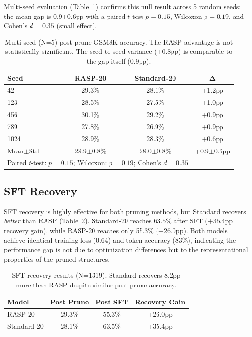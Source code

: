 \documentclass[11pt,a4paper]{article}
\begin{document}
Multi-seed evaluation (Table~\ref{tab:multiseed}) confirms this null result across 5 random seeds: the mean gap is 0.9$\pm$0.6pp with a paired $t$-test $p{=}0.15$, Wilcoxon $p{=}0.19$, and Cohen's $d{=}0.35$ (small effect).

\begin{table}[t]
\centering
\small
\begin{tabular}{lccc}
\toprule
\textbf{Seed} & \textbf{RASP-20} & \textbf{Standard-20} & $\boldsymbol{\Delta}$ \\
\midrule
42 & 29.3\% & 28.1\% & +1.2pp \\
123 & 28.5\% & 27.5\% & +1.0pp \\
456 & 30.1\% & 29.2\% & +0.9pp \\
789 & 27.8\% & 26.9\% & +0.9pp \\
1024 & 28.9\% & 28.3\% & +0.6pp \\
\midrule
Mean$\pm$Std & 28.9$\pm$0.8\% & 28.0$\pm$0.8\% & +0.9$\pm$0.6pp \\
\multicolumn{3}{l}{Paired $t$-test: $p{=}0.15$; Wilcoxon: $p{=}0.19$; Cohen's $d{=}0.35$} \\
\bottomrule
\end{tabular}
\caption{Multi-seed (N=5) post-prune GSM8K accuracy. The RASP advantage is not statistically significant. The seed-to-seed variance ($\pm$0.8pp) is comparable to the gap itself (0.9pp).}
\label{tab:multiseed}
\end{table}


\subsection{SFT Recovery}
\label{sec:sft}

SFT recovery is highly effective for both pruning methods, but Standard recovers \emph{better} than RASP (Table~\ref{tab:sft}). Standard-20 reaches 63.5\% after SFT (+35.4pp recovery gain), while RASP-20 reaches only 55.3\% (+26.0pp). Both models achieve identical training loss (0.64) and token accuracy (83\%), indicating the performance gap is not due to optimization differences but to the representational properties of the pruned structures.

\begin{table}[t]
\centering
\small
\begin{tabular}{lccc}
\toprule
\textbf{Model} & \textbf{Post-Prune} & \textbf{Post-SFT} & \textbf{Recovery Gain} \\
\midrule
RASP-20 & 29.3\% & 55.3\% & +26.0pp \\
Standard-20 & 28.1\% & 63.5\% & +35.4pp \\
\bottomrule
\end{tabular}
\caption{SFT recovery results (N=1319). Standard recovers 8.2pp more than RASP despite similar post-prune accuracy.}
\label{tab:sft}
\end{table}
\end{document}
